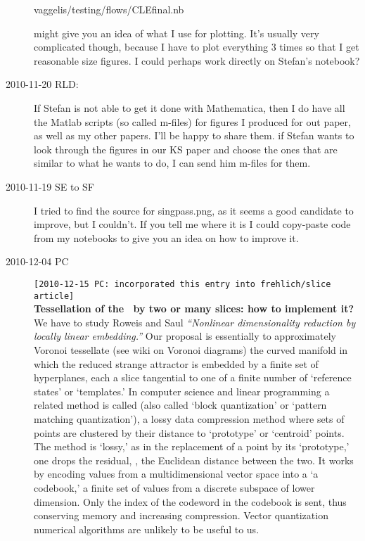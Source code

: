 \begin{description}
vaggelis/testing/flows/CLEfinal.nb

might give you an idea of what I use for plotting. It's usually very
complicated though, because I have to plot everything 3 times so that
I get reasonable size figures. I could perhaps work directly on
Stefan's notebook?

\item[2010-11-20 RLD:]
If Stefan is not able to get it done with Mathematica, then I do have all
the Matlab scripts (so called m-files) for figures I produced for out
paper, as well as my other papers.  I'll be happy to share them. if
Stefan wants to look through the figures in our KS paper and choose the
ones that are similar to what he wants to do, I can send him m-files for
them.

\item[2010-11-19 SE to SF]
I tried to find the source for singpass.png, as it seems a good candidate
to improve, but I couldn't. If you tell me where it is I could copy-paste
code from my notebooks to give you an idea on how to improve it.

\item[2010-12-04 PC] \texttt{[2010-12-15 PC: incorporated this entry into
frehlich/slice article]}
\\
{\bf Tessellation of the \reducedsp\ by two or many slices:
how to implement it?}
We have to study Roweis%
 and Saul
\emph{``Nonlinear dimensionality reduction by locally linear embedding.''}
Our proposal is essentially to approximately
 {Voronoi
tessellate} (see 
{wiki on Voronoi diagrams}) the curved manifold in which the reduced
strange attractor is embedded by a finite set of hyperplanes, each a
slice tangential to one of a finite number of `reference states' or
`templates.' In computer science and linear programming a related method
is called  (also called `block quantization' or `pattern matching
quantization'), a lossy data compression method where sets of points are
clustered by their distance to `prototype' or `centroid' points. The
method is `lossy,' as in the replacement of a point by its `prototype,'
one drops the residual, \ie, the Euclidean distance between the two. It
works by encoding values from a multidimensional vector space into a `a
codebook,' a finite set of values from a discrete subspace of lower
dimension. Only the index of the codeword in the codebook is sent, thus
conserving memory and increasing compression. Vector quantization
numerical algorithms are unlikely to be useful to us.


\end{description}
